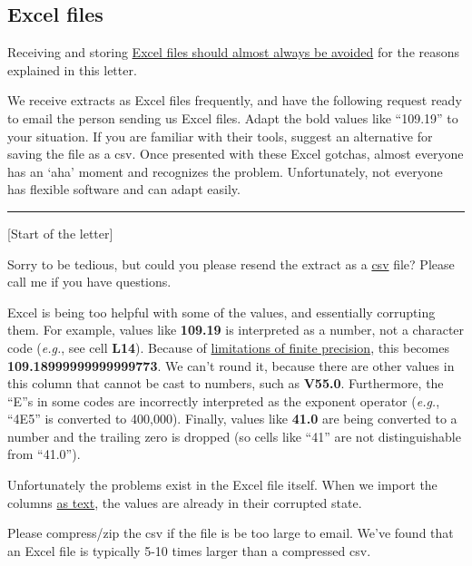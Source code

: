\documentclass[
]{book}
\begin{document}
\hypertarget{snippets-correspondence-excel}{%
\subsection{Excel files}\label{snippets-correspondence-excel}}

Receiving and storing \protect\hyperlink{data-containers-avoid}{Excel files should almost always be avoided} for the reasons explained in this letter.

We receive extracts as Excel files frequently, and have the following request ready to email the person sending us Excel files. Adapt the bold values like ``109.19'' to your situation. If you are familiar with their tools, suggest an alternative for saving the file as a csv. Once presented with these Excel gotchas, almost everyone has an `aha' moment and recognizes the problem. Unfortunately, not everyone has flexible software and can adapt easily.

\begin{center}\rule{0.5\linewidth}{0.5pt}\end{center}

{[}Start of the letter{]}

Sorry to be tedious, but could you please resend the extract as a \href{https://en.wikipedia.org/wiki/Comma-separated_values}{csv} file? Please call me if you have questions.

Excel is being too helpful with some of the values, and essentially corrupting them. For example, values like \textbf{109.19} is interpreted as a number, not a character code (\emph{e.g.}, see cell \textbf{L14}). Because of \href{https://docs.oracle.com/cd/E19957-01/806-3568/ncg_goldberg.html}{limitations of finite precision}, this becomes \textbf{109.18999999999999773}. We can't round it, because there are other values in this column that cannot be cast to numbers, such as \textbf{V55.0}. Furthermore, the ``E''s in some codes are incorrectly interpreted as the exponent operator (\emph{e.g.}, ``4E5'' is converted to 400,000). Finally, values like \textbf{41.0} are being converted to a number and the trailing zero is dropped (so cells like ``41'' are not distinguishable from ``41.0'').

Unfortunately the problems exist in the Excel file itself. When we import the columns \href{https://readxl.tidyverse.org/reference/read_excel.html}{as text}, the values are already in their corrupted state.

Please compress/zip the csv if the file is be too large to email. We've found that an Excel file is typically 5-10 times larger than a compressed csv.
\end{document}
